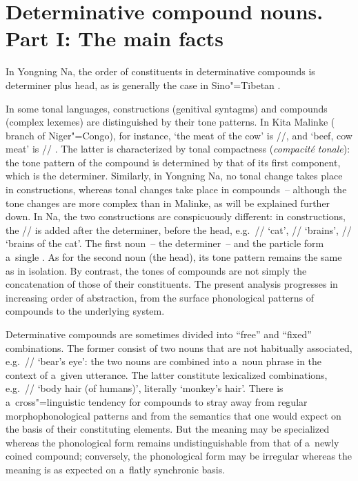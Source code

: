 \section{Determinative compound nouns. Part I: The main facts}
\label{sec:determinativecompoundnouns}

In Yongning Na, the
order of constituents in determinative compounds is determiner plus head, as is generally the case in Sino"=Tibetan
\citep{michailovsky2011}.

In some tonal languages,  constructions (genitival syntagms) and compounds (complex
lexemes) are distinguished by their tone patterns. In Kita Malinke ( branch of Niger"=Congo), for instance, ‘the meat of the cow’ is
//, and ‘beef, cow meat’ is // \citep{creisselsetal1993}. The
latter is characterized by tonal compactness (\textit{compacité tonale}): the tone pattern of the
compound is determined by that of its first component, which is the determiner. Similarly, in
Yongning Na, no tonal change takes place in  constructions, whereas tonal changes take
place in compounds~-- although the tone changes are more complex than in Malinke, as will be explained further down. In Na, the two constructions are conspicuously different: in 
constructions, the  // is added after the determiner, before the head,
e.g.~// ‘cat’, // ‘brains’, // ‘brains of the
cat’. The first noun~-- the determiner~-- and the  particle form a~single . As
for the second noun (the head), its tone pattern remains the same as in isolation. By contrast, the tones of compounds are not simply the concatenation of those of their constituents. The present
analysis progresses in increasing order of abstraction, from the surface phonological patterns of
compounds to the underlying system.

Determinative compounds are sometimes divided into “free” and “fixed” combinations. The former consist of two nouns that are not
habitually associated, e.g.~// ‘bear’s eye’: the two nouns are combined into
a~noun phrase in the context of a~given utterance. The
latter constitute lexicalized combinations, e.g.~// ‘body hair (of humans)’, literally ‘monkey’s hair’. There is a~cross"=linguistic tendency for compounds to stray away from regular morphophonological
patterns and from the semantics that one would expect on the basis of their
constituting elements. But the meaning may
be specialized whereas the phonological form
remains undistinguishable from that of a~newly coined compound; conversely, the phonological form may
be irregular whereas the meaning is as expected on a~flatly synchronic basis. 

